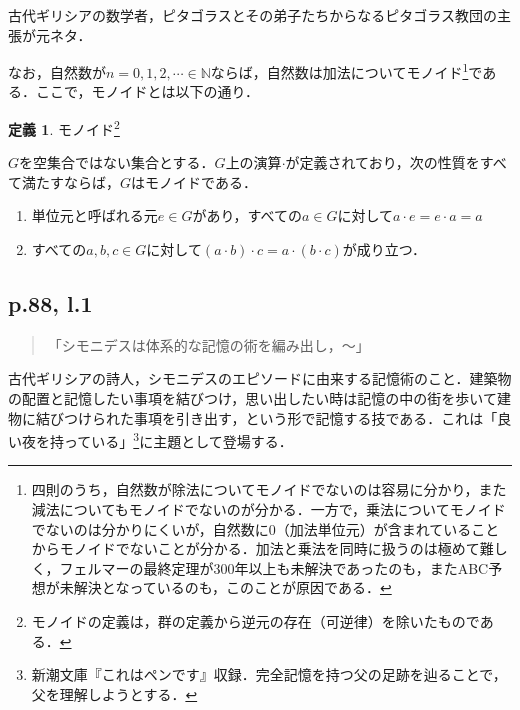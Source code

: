 \documentclass[10pt, a5paper, twoside]{jsarticle}
\theoremstyle{definition}
\newtheorem{dfn}{定義}
\begin{document}
			古代ギリシアの数学者，ピタゴラスとその弟子たちからなるピタゴラス教団の主張が元ネタ．

			なお，自然数が$n = 0, 1, 2, \cdots \in \mathbb{N}$ならば，自然数は加法についてモノイド\footnote{四則のうち，自然数が除法についてモノイドでないのは容易に分かり，また減法についてもモノイドでないのが分かる．一方で，乗法についてモノイドでないのは分かりにくいが，自然数に0（加法単位元）が含まれていることからモノイドでないことが分かる．加法と乗法を同時に扱うのは極めて難しく，フェルマーの最終定理が300年以上も未解決であったのも，またABC予想が未解決となっているのも，このことが原因である．}である．ここで，モノイドとは以下の通り．

			\begin{dfn}

				モノイド\footnote{モノイドの定義は，群の定義から逆元の存在（可逆律）を除いたものである．}

				$G$を空集合ではない集合とする．$G$上の演算$\cdot$が定義されており，次の性質をすべて満たすならば，$G$はモノイドである．

				\begin{enumerate}
					
					\item 単位元と呼ばれる元$e \in G$があり，すべての$a \in G$に対して$a \cdot e = e \cdot a = a$

					\item すべての$a, b, c \in G$に対して$(a \cdot b) \cdot c = a \cdot (b \cdot c)$が成り立つ．

				\end{enumerate}
				
			\end{dfn}

		\subsection{p.88, l.1}

			\begin{quote}

				「シモニデスは体系的な記憶の術を編み出し，〜」
				
			\end{quote}

			古代ギリシアの詩人，シモニデスのエピソードに由来する記憶術のこと．建築物の配置と記憶したい事項を結びつけ，思い出したい時は記憶の中の街を歩いて建物に結びつけられた事項を引き出す，という形で記憶する技である．これは「良い夜を持っている」\footnote{新潮文庫『これはペンです』収録．完全記憶を持つ父の足跡を辿ることで，父を理解しようとする．}に主題として登場する．
\end{document}
